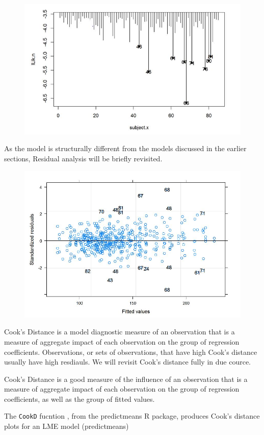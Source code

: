\documentclass[12pt, a4paper]{report}
\theoremstyle{plain}
\theoremstyle{definition}
\theoremstyle{remark}
\begin{document}
\begin{figure}[h!]
	\centering
	\includegraphics[width=0.7\linewidth]{images/LogLik-JS-Roy}
	\caption{}
	\label{fig:LogLik-JS-Roy}
\end{figure}

As the model is structurally different from the models discussed in the earlier sections, Residual analysis will be briefly revisited.
\begin{figure}[h!]
	\centering
	\includegraphics[width=0.7\linewidth]{images/Residuals-JS-Roy}
	\caption{}
	\label{fig:Residuals-JS-Roy}
\end{figure}


Cook's Distance is a model diagnostic measure of an observation that is a measure of aggregate impact of each observation on the group of regression coefficients. Observations, or sets of observations, that have high Cook's distance usually have high resdiauls. We will revisit Cook's distance fully in due cource.

Cook's Distance is a good measure of the influence of an observation that is a measure of aggregate impact of each observation on the group of regression coefficients, as well as the group of fitted values.

The \texttt{CookD} fucntion , from the predictmeans R package, produces Cook’s distance plots for an LME model 
(predictmeans)
\end{document}
